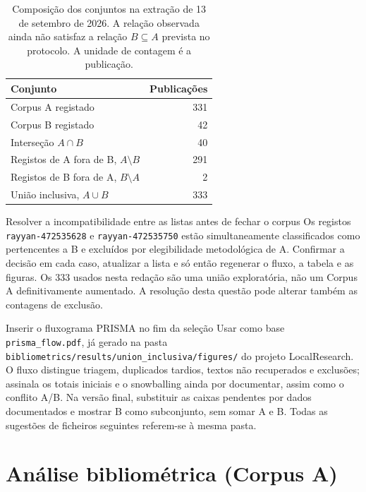 \begin{table}[htbp]
  \centering
  \caption{Composição dos conjuntos na extração de 13 de setembro de 2026.
  A relação observada ainda não satisfaz a relação $B\subseteq A$
  prevista no protocolo. A unidade de contagem é a publicação.}
  \label{tab:composicao-corpora}
  \begin{tabular}{lr}
    \toprule
    Conjunto & Publicações \\
    \midrule
    Corpus A registado & 331 \\
    Corpus B registado & 42 \\
    Interseção $A\cap B$ & 40 \\
    Registos de A fora de B, $A\setminus B$ & 291 \\
    Registos de B fora de A, $B\setminus A$ & 2 \\
    União inclusiva, $A\cup B$ & 333 \\
    \bottomrule
  \end{tabular}
\end{table}

{Resolver a incompatibilidade entre as listas antes de fechar o corpus}
{Os registos \texttt{rayyan-472535628} e \texttt{rayyan-472535750}
estão simultaneamente classificados como pertencentes a B e excluídos
por elegibilidade metodológica de A. Confirmar a decisão em cada caso,
atualizar a lista e só então regenerar o fluxo, a tabela e as figuras.
Os 333 usados nesta redação são uma união exploratória, não um Corpus A
definitivamente aumentado. A resolução desta questão pode alterar
também as contagens de exclusão.}%

{Inserir o fluxograma PRISMA no fim da seleção}
{Usar como base \texttt{prisma\_flow.pdf}, já gerado na pasta
\nolinkurl{bibliometrics/results/union_inclusiva/figures/} do projeto
LocalResearch. O fluxo distingue triagem, duplicados tardios, textos
não recuperados e exclusões; assinala os totais iniciais e o
snowballing ainda por documentar, assim como o conflito A/B. Na
versão final, substituir as caixas pendentes por dados documentados
e mostrar B como subconjunto, sem somar A e B. Todas as sugestões
de ficheiros seguintes referem-se à mesma pasta.}%


\section{Análise bibliométrica (Corpus A)}
\label{sec:corpus-a}

